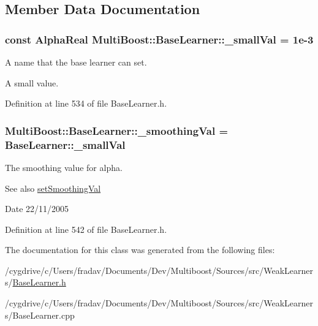 \subsection{Member Data Documentation}
\hypertarget{classMultiBoost_1_1BaseLearner_ae03efe7fec838d634449716c445c2bfb}{
\subsubsection[{\_\-smallVal}]{\setlength{\rightskip}{0pt plus 5cm}const {\bf AlphaReal} {\bf MultiBoost::BaseLearner::\_\-smallVal} = 1e-\/3}}
\label{classMultiBoost_1_1BaseLearner_ae03efe7fec838d634449716c445c2bfb}


A name that the base learner can set. 

A small value. 

Definition at line 534 of file BaseLearner.h.

\hypertarget{classMultiBoost_1_1BaseLearner_a3b89ad0959563ba3e0fa9d21198aba4d}{
\subsubsection[{\_\-smoothingVal}]{ {\bf MultiBoost::BaseLearner::\_\-smoothingVal} = {\bf BaseLearner::\_\-smallVal}}}
\label{classMultiBoost_1_1BaseLearner_a3b89ad0959563ba3e0fa9d21198aba4d}
The smoothing value for alpha. \begin{DoxySeeAlso}{See also}
\hyperlink{classMultiBoost_1_1BaseLearner_a02657dfe35ffff80d2b2fb44e2d8731c}{setSmoothingVal} 
\end{DoxySeeAlso}
\begin{DoxyDate}{Date}
22/11/2005 
\end{DoxyDate}


Definition at line 542 of file BaseLearner.h.



The documentation for this class was generated from the following files:\begin{DoxyCompactItemize}
\item 
/cygdrive/c/Users/fradav/Documents/Dev/Multiboost/Sources/src/WeakLearners/\hyperlink{BaseLearner_8h}{BaseLearner.h}\item 
/cygdrive/c/Users/fradav/Documents/Dev/Multiboost/Sources/src/WeakLearners/BaseLearner.cpp\end{DoxyCompactItemize}
